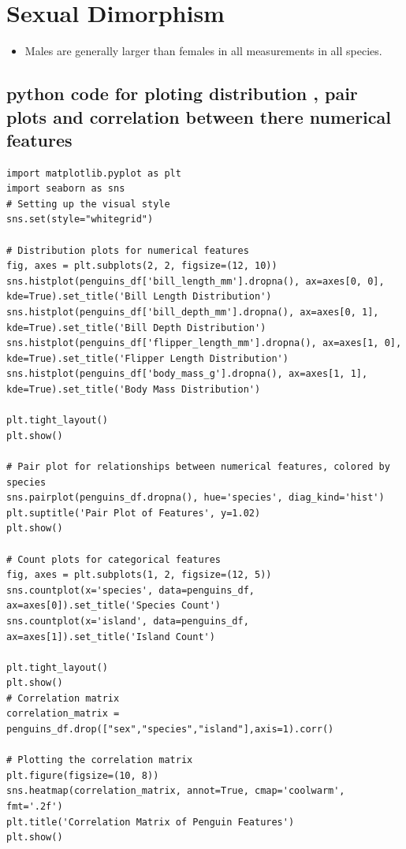 \documentclass[12pt]{article}
\begin{document}
\section*{Sexual Dimorphism}
\begin{itemize}
    \item Males are generally larger than females in all measurements in all species.
   
\end{itemize}
\subsection*{python code for ploting distribution , pair plots and correlation between there numerical features }
\begin{verbatim}
import matplotlib.pyplot as plt
import seaborn as sns
# Setting up the visual style
sns.set(style="whitegrid")

# Distribution plots for numerical features
fig, axes = plt.subplots(2, 2, figsize=(12, 10))
sns.histplot(penguins_df['bill_length_mm'].dropna(), ax=axes[0, 0], kde=True).set_title('Bill Length Distribution')
sns.histplot(penguins_df['bill_depth_mm'].dropna(), ax=axes[0, 1], kde=True).set_title('Bill Depth Distribution')
sns.histplot(penguins_df['flipper_length_mm'].dropna(), ax=axes[1, 0], kde=True).set_title('Flipper Length Distribution')
sns.histplot(penguins_df['body_mass_g'].dropna(), ax=axes[1, 1], kde=True).set_title('Body Mass Distribution')

plt.tight_layout()
plt.show()

# Pair plot for relationships between numerical features, colored by species
sns.pairplot(penguins_df.dropna(), hue='species', diag_kind='hist')
plt.suptitle('Pair Plot of Features', y=1.02)
plt.show()

# Count plots for categorical features
fig, axes = plt.subplots(1, 2, figsize=(12, 5))
sns.countplot(x='species', data=penguins_df, ax=axes[0]).set_title('Species Count')
sns.countplot(x='island', data=penguins_df, ax=axes[1]).set_title('Island Count')

plt.tight_layout()
plt.show()
# Correlation matrix
correlation_matrix = penguins_df.drop(["sex","species","island"],axis=1).corr()

# Plotting the correlation matrix
plt.figure(figsize=(10, 8))
sns.heatmap(correlation_matrix, annot=True, cmap='coolwarm', fmt='.2f')
plt.title('Correlation Matrix of Penguin Features')
plt.show()

\end{verbatim}
\end{document}
